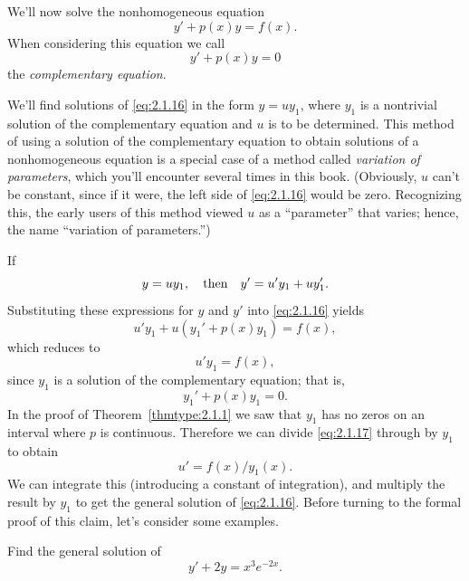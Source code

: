 \color{blue}
\color{black}


\noindent
We'll now solve the nonhomogeneous equation
\begin{equation}
  \label{eq:2.1.16}y'+p(x)y=f(x).
\end{equation}
When considering this equation we call
\[
  y'+p(x)y=0
\]
the {\color{blue}\it complementary equation}.

We'll find solutions of \eqref{eq:2.1.16} in the form $y=uy_{1}$, where $y_{1}$ is a nontrivial
solution of the complementary equation and $u$ is to be determined. This method of using a solution
of the complementary equation to obtain solutions of a nonhomogeneous equation is a special case of
a method called {\color{blue}\it variation of parameters\/}, which you'll encounter several times in
this book. (Obviously, $u$ can't be constant, since if it were, the left side of \eqref{eq:2.1.16}
would be zero. Recognizing this, the early users of this method viewed $u$ as a ``parameter'' that
varies; hence, the name ``variation of parameters.'')

If
\[
  y=uy_{1},\mbox{\quad then\quad}y'=u'y_{1}+uy_{1}'.
\]
Substituting these expressions for $y$ and $y'$ into \eqref{eq:2.1.16} yields
\[
  u'y_{1}+u(y_{1}'+p(x)y_{1})=f(x),
\]
which reduces to
\begin{equation}
  \label{eq:2.1.17}u'y_{1}=f(x),
\end{equation}
since $y_{1}$ is a solution of the complementary equation; that is,
\[
  y_{1}'+p(x)y_{1}=0.
\]
In the proof of Theorem~\ref{thmtype:2.1.1} we saw that $y_{1}$ has no zeros on an interval where
$p$ is continuous. Therefore we can divide \eqref{eq:2.1.17} through by $y_{1}$ to obtain
\[
  u'=f(x)/y_{1}(x).
\]
We can integrate this (introducing a constant of integration), and multiply the result by $y_{1}$ to
get the general solution of \eqref{eq:2.1.16}. Before turning to the formal proof of this claim,
let's consider some examples.

\begin{example}
  \label{example:2.1.5}\rm Find the general solution of
  \begin{equation}
    \label{eq:2.1.18}y'+2y=x^{3}e^{-2x}.
  \end{equation}
\end{example}

